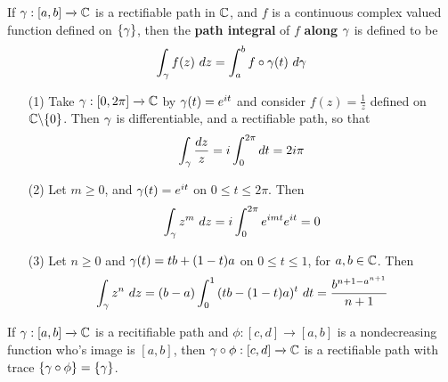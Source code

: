 \begin{definition}
    If $\gamma:[a,b] \xrightarrow{} \mathbb{C}$ is a rectifiable path in $\mathbb{C}$, and $f$ is a
    continuous complex valued function defined on  $\{\gamma\}$, then the
    \textbf{path integral} of $f$  \textbf{along} $\gamma$ is defined to be
    \begin{equation*}
        \int_\gamma{f(z) \ dz}=\int_a^b{f \circ \gamma(t) \ d\gamma}
    \end{equation*}
\end{definition}

\begin{example}\label{example_4.1}
    \begin{enumerate}
        \item[(1)] Take $\gamma:[0,2\pi] \xrightarrow{} \mathbb{C}$ by $\gamma(t)=e^{it}$ and
            consider $f(z)=\frac{1}{z}$ defined on $\mathbb{C} \backslash \{0\}$. Then $\gamma$
            is differentiable, and a rectifiable path, so that
            \begin{equation*}
                \int_\gamma{\frac{dz}{z}}=i\int_0^{2\pi}{dt}=2i\pi
            \end{equation*}

        \item[(2)] Let $m \geq 0$, and  $\gamma(t)=e^{it}$ on $0 \leq t \leq 2\pi$.
            Then
            \begin{equation*}
                \int_\y{z^m \ dz}=i\int_0^{2\pi}{e^{imt}e^{it}}=0
            \end{equation*}

        \item[(3)] Let $n \geq 0$ and $\gamma(t)=tb+(1-t)a$ on $0 \leq t \leq 1$,
            for $a,b \in \mathbb{C}$. Then
            \begin{equation*}
                \int_\y{z^n \ dz}=(b-a)\int_0^1{(tb-(1-t)a)^t \ dt}=
                \frac{b^{n+1-a^{n+1}}}{n+1}
            \end{equation*}
    \end{enumerate}
\end{example}

\begin{lemma}\label{4.2.1}
    If $\gamma:[a,b] \xrightarrow{} \mathbb{C}$ is a recitifiable path and $\phi:[c,d]
    \xrightarrow{} [a,b]$ is a nondecreasing function who's image is $[a,b]$,
    then $\gamma \circ \phi:[c,d] \xrightarrow{} \mathbb{C}$ is a rectifiable path with
    trace $\{\gamma \circ \phi\}=\{\gamma\}$.
\end{lemma}

